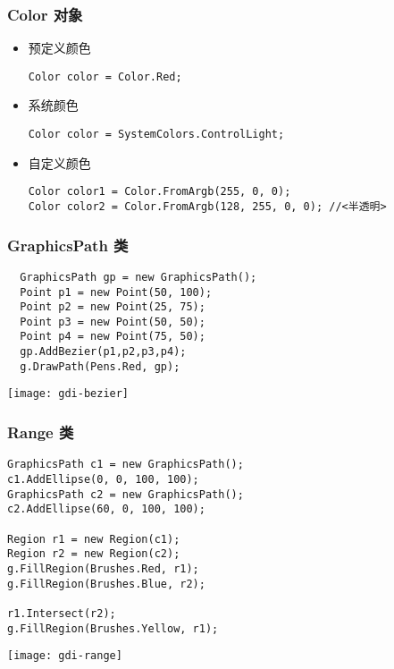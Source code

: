 \begin{frame}[fragile]
\frametitle{Color 对象}
\begin{itemize}
\item 预定义颜色
\begin{lstlisting}
Color color = Color.Red;
\end{lstlisting}
\item 系统颜色
\begin{lstlisting}
Color color = SystemColors.ControlLight;
\end{lstlisting}
\item 自定义颜色
\begin{lstlisting}[escapeinside=<>]
Color color1 = Color.FromArgb(255, 0, 0);
Color color2 = Color.FromArgb(128, 255, 0, 0); //<半透明>
\end{lstlisting}
\end{itemize}
\end{frame}

\begin{frame}[fragile]
\frametitle{GraphicsPath 类}
\begin{lstlisting}
  GraphicsPath gp = new GraphicsPath();
  Point p1 = new Point(50, 100);
  Point p2 = new Point(25, 75);
  Point p3 = new Point(50, 50);
  Point p4 = new Point(75, 50);
  gp.AddBezier(p1,p2,p3,p4);
  g.DrawPath(Pens.Red, gp);
\end{lstlisting}
\centering \texttt{[image: gdi-bezier]}
\end{frame}

\begin{frame}[fragile]
\frametitle{Range 类}
\begin{lstlisting}
GraphicsPath c1 = new GraphicsPath();
c1.AddEllipse(0, 0, 100, 100);
GraphicsPath c2 = new GraphicsPath();
c2.AddEllipse(60, 0, 100, 100);

Region r1 = new Region(c1);
Region r2 = new Region(c2);
g.FillRegion(Brushes.Red, r1);
g.FillRegion(Brushes.Blue, r2);

r1.Intersect(r2);
g.FillRegion(Brushes.Yellow, r1);
\end{lstlisting}
\centering \texttt{[image: gdi-range]}
\end{frame}


